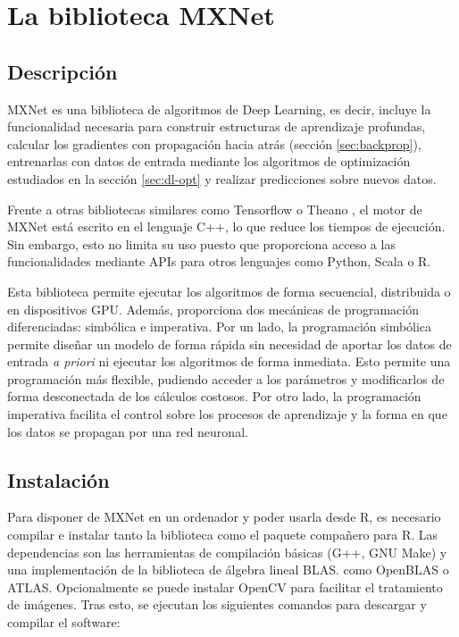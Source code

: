 \section{La biblioteca MXNet}\label{sec:mxnet}
\subsection{Descripción}
MXNet \autocite{mxnet} es una biblioteca de algoritmos de Deep Learning, es decir, incluye la funcionalidad necesaria para construir estructuras de aprendizaje profundas, calcular los gradientes con propagación hacia atrás (sección \ref{sec:backprop}), entrenarlas con datos de entrada mediante los algoritmos de optimización estudiados en la sección \ref{sec:dl-opt} y realizar predicciones sobre nuevos datos.

Frente a otras bibliotecas similares como Tensorflow \autocite{tensorflow} o Theano \autocite{theano}, el motor de MXNet está escrito en el lenguaje C++, lo que reduce los tiempos de ejecución. Sin embargo, esto no limita su uso puesto que proporciona acceso a las funcionalidades mediante APIs para otros lenguajes como Python, Scala o R.

Esta biblioteca permite ejecutar los algoritmos de forma secuencial, distribuida o en dispositivos GPU. Además, proporciona dos mecánicas de programación diferenciadas: simbólica e imperativa. Por un lado, la programación simbólica permite diseñar un modelo de forma rápida sin necesidad de aportar los datos de entrada \textit{a priori} ni ejecutar los algoritmos de forma inmediata. Esto permite una programación más flexible, pudiendo acceder a los parámetros y modificarlos de forma desconectada de los cálculos costosos. Por otro lado, la programación imperativa facilita el control sobre los procesos de aprendizaje y la forma en que los datos se propagan por una red neuronal.

\subsection{Instalación}

Para disponer de MXNet en un ordenador y poder usarla desde R, es necesario compilar e instalar tanto la biblioteca como el paquete compañero para R. Las dependencias son las herramientas de compilación básicas (G++, GNU Make) y una implementación de la biblioteca de álgebra lineal BLAS. como OpenBLAS o ATLAS. Opcionalmente se puede instalar OpenCV para facilitar el tratamiento de imágenes. Tras esto, se ejecutan los siguientes comandos para descargar y compilar el software:

